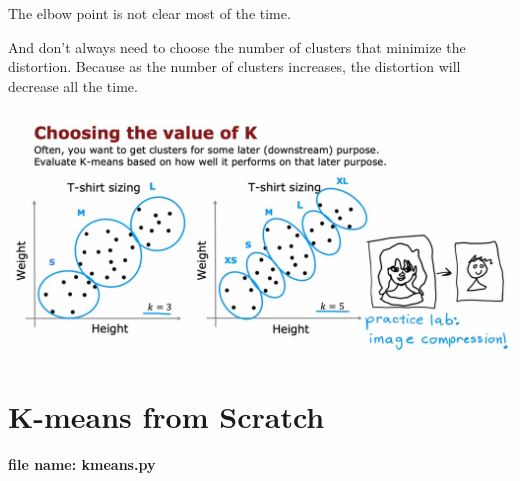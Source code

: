 \begin{notebox}
    \hspace{2em}The elbow point is not clear most of the time.\par
    \hspace{2em}And don't always need to choose the number of clusters that minimize the distortion.
    Because as the number of clusters increases, the distortion will decrease all the time.
\end{notebox}

\includegraphics[width=\textwidth]{images/km5}

\section{K-means from Scratch}
\textbf{file name: kmeans.py}
